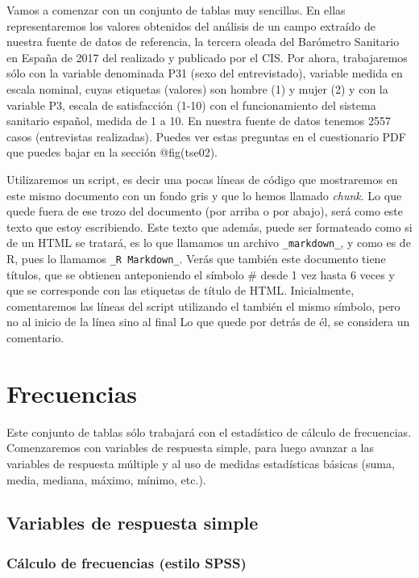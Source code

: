 \documentclass[
]{book}
\begin{document}
Vamos a comenzar con un conjunto de tablas muy sencillas. En ellas representaremos los valores obtenidos del análisis de un campo extraído de nuestra fuente de datos de referencia, la tercera oleada del Barómetro Sanitario en España de 2017 del realizado y publicado por el CIS. Por ahora, trabajaremos sólo con la variable denominada P31 (sexo del entrevistado), variable medida en escala nominal, cuyas etiquetas (valores) son hombre (1) y mujer (2) y con la variable P3, escala de satisfacción (1-10) con el funcionamiento del sistema sanitario español, medida de 1 a 10. En nuestra fuente de datos tenemos 2557 casos (entrevistas realizadas). Puedes ver estas preguntas en el cuestionario PDF que puedes bajar en la sección @fig(tse02).

Utilizaremos un script, es decir una pocas líneas de código que mostraremos en este mismo documento con un fondo gris y que lo hemos llamado \emph{chunk}. Lo que quede fuera de ese trozo del documento (por arriba o por abajo), será como este texto que estoy escribiendo. Este texto que además, puede ser formateado como si de un HTML se tratará, es lo que llamamos un archivo \texttt{\_markdown\_}, y como es de R, pues lo llamamos \texttt{\_R\ Markdown\_}. Verás que también este documento tiene títulos, que se obtienen anteponiendo el símbolo \# desde 1 vez hasta 6 veces y que se corresponde con las etiquetas de título de HTML. Inicialmente, comentaremos las líneas del script utilizando el también el mismo símbolo, pero no al inicio de la línea sino al final Lo que quede por detrás de él, se considera un comentario.

\hypertarget{frecuencias}{%
\section{Frecuencias}\label{frecuencias}}

Este conjunto de tablas sólo trabajará con el estadístico de cálculo de frecuencias. Comenzaremos con variables de respuesta simple, para luego avanzar a las variables de respuesta múltiple y al uso de medidas estadísticas básicas (suma, media, mediana, máximo, mínimo, etc.).

\hypertarget{variables-de-respuesta-simple}{%
\subsection{Variables de respuesta simple}\label{variables-de-respuesta-simple}}

\hypertarget{cuxe1lculo-de-frecuencias-estilo-spss}{%
\subsubsection{Cálculo de frecuencias (estilo SPSS)}\label{cuxe1lculo-de-frecuencias-estilo-spss}}
\end{document}
